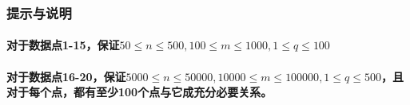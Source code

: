 \documentclass[final,11pt,oneside,UTF8]{report}
\begin{document}
\subsubsection{提示与说明}
\paragraph{对于数据点1-15，保证$50\le n \le 500,100\le m \le 1000,1\le q \le 100$}
\paragraph{对于数据点16-20，保证$5000\le n \le 50000,10000\le m \le 100000,1\le q \le 500$，且对于每个点，都有至少100个点与它成充分必要关系。}
\newpage
\end{document}
